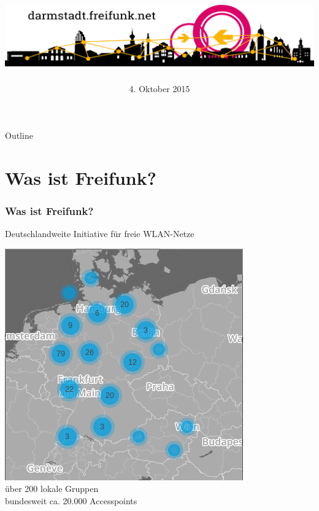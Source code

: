 \documentclass[handout]{beamer}
\title{\centering\includegraphics[width=\textwidth]{images/logo-skyline}}
\author{}
\date{\footnotesize 4. Oktober 2015}
\begin{document}
\begin{frame}
\maketitle
\end{frame}


\begin{frame}{Outline}
\tableofcontents
\end{frame}

\section{Was ist Freifunk?}
\begin{frame}
	\frametitle{Was ist Freifunk?}

	Deutschlandweite Initiative für freie WLAN-Netze
	
	\pause
	\vfill
	\centering
	\includegraphics[scale=0.3]{images/2015-10_freifunk-map} \\
	über 200 lokale Gruppen\\bundesweit ca. 20.000 Accesspoints

	
\end{frame}
\end{document}
